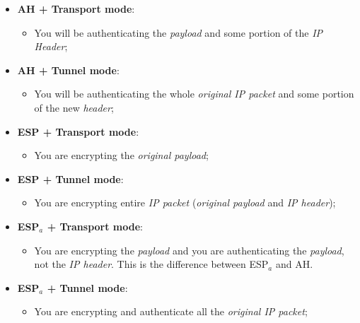 \documentclass{article}
\begin{document}
\begin{itemize}
\item \textbf{AH + Transport mode}:
\begin{itemize}
\item You will be authenticating the \emph{payload} and some portion of the \emph{IP Header};
\end{itemize}
\item \textbf{AH + Tunnel mode}:
\begin{itemize}
\item You will be authenticating the whole \emph{original IP packet} and some portion of the new \emph{header};
\end{itemize}
\item \textbf{ESP + Transport mode}:
\begin{itemize}
\item You are encrypting the \emph{original payload};
\end{itemize}
\item \textbf{ESP + Tunnel mode}:
\begin{itemize}
\item You are encrypting entire \emph{IP packet} (\emph{original payload} and \emph{IP header});
\end{itemize}
\item \textbf{ESP$_a$ + Transport mode}:
\begin{itemize}
\item You are encrypting the \emph{payload} and you are authenticating the \emph{payload}, not the \emph{IP header}. This is the difference between ESP$_a$ and AH.
\end{itemize}
\item \textbf{ESP$_a$ + Tunnel mode}:
\begin{itemize}
\item You are encrypting and authenticate all the \emph{original IP packet};
\end{itemize}
\end{itemize}
\end{document}
